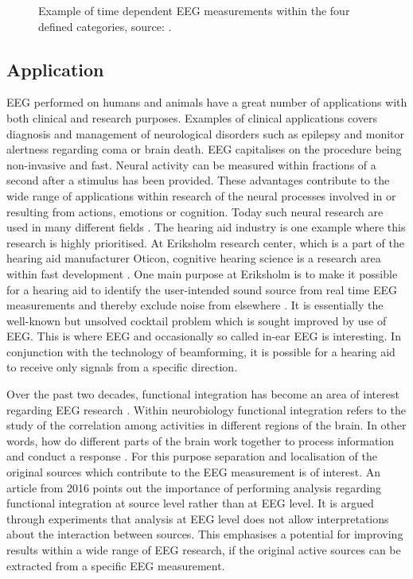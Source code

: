 \begin{figure}[H]
\begin{minipage}[t]{.45\textwidth}
        \caption{Example of time dependent EEG measurements within the four defined categories, source: \cite{EEGsignalprocessing}.}\label{fig:EEG_example}
    \end{minipage}
\end{figure}

\subsection{Application}\label{seg:application}
EEG performed on humans and animals have a great number of applications with both clinical and research purposes. 
Examples of clinical applications covers diagnosis and management of neurological disorders such as epilepsy and monitor alertness regarding coma or brain death.
EEG capitalises on the procedure being non-invasive and fast.
Neural activity can be measured within fractions of a second after a stimulus has been provided. 
These advantages contribute to the wide range of applications within research of the neural processes involved in or resulting from actions, emotions or cognition. Today such neural research are used in many different fields \cite[p. 4]{fundamentalEEG}.
The hearing aid industry is one example where this research is highly prioritised. 
At Eriksholm research center, which is a part of the hearing aid manufacturer Oticon, cognitive hearing science is a research area within fast development \cite{Weberik}. 
One main purpose at Eriksholm is to make it possible for a hearing aid to identify the user-intended sound source from real time EEG measurements and thereby exclude noise from elsewhere \cite{Emina2019} \cite{Bech2018}. 
It is essentially the well-known but unsolved cocktail problem which is sought improved by use of EEG. 
This is where EEG and occasionally so called in-ear EEG is interesting. In conjunction with the technology of beamforming, it is possible for a hearing aid to receive only signals from a specific direction. 

Over the past two decades, functional integration has become an area of interest regarding EEG research \cite{Friston2011}. 
Within neurobiology functional integration refers to the study of the correlation among activities in different regions of the brain. 
In other words, how do different parts of the brain work together to process information and conduct a response \cite{Friston2002}. 
For this purpose separation and localisation of the original sources which contribute to the EEG measurement is of interest. 
An article from 2016 \cite{Van2019} points out the importance of performing analysis regarding functional integration at source level rather than at EEG level. 
It is argued through experiments that analysis at EEG level does not allow interpretations about the interaction between sources. 
This emphasises a potential for improving results within a wide range of EEG research, if the original active sources can be extracted from a specific EEG measurement.    

